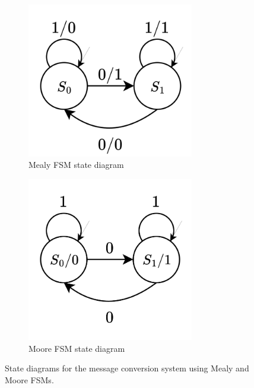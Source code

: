 \documentclass[../main.tex]{subfiles}
\begin{document}
\vspace{-10pt}
\begin{figure}[h]
    \centering
    \begin{subfigure}{0.48\textwidth}
        \centering
        \includegraphics[width=0.8\textwidth]{assets/q2_mealy.png}
        \caption{Mealy FSM state diagram}
        \label{fig:q2_mealy}
    \end{subfigure}
    \hfill
    \begin{subfigure}{0.48\textwidth}
        \centering
        \includegraphics[width=0.8\textwidth]{assets/q2_moore.png}
        \caption{Moore FSM state diagram}
        \label{fig:q2_moore}
    \end{subfigure}
    \caption{State diagrams for the message conversion system using Mealy and Moore FSMs.}
    \label{fig:q2_fsm}
\end{figure}

\newpage
\end{document}
